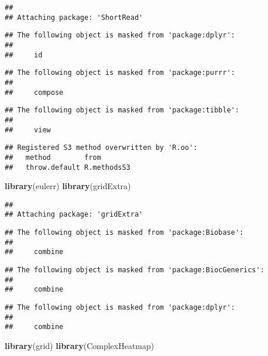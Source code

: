 \documentclass[]{article}
\newenvironment{Shaded}{\begin{snugshade}}{\end{snugshade}}
\newcommand{\KeywordTok}[1]{\textcolor[rgb]{0.13,0.29,0.53}{\textbf{#1}}}
\newcommand{\NormalTok}[1]{#1}
\begin{document}
\begin{verbatim}
## 
## Attaching package: 'ShortRead'
\end{verbatim}

\begin{verbatim}
## The following object is masked from 'package:dplyr':
## 
##     id
\end{verbatim}

\begin{verbatim}
## The following object is masked from 'package:purrr':
## 
##     compose
\end{verbatim}

\begin{verbatim}
## The following object is masked from 'package:tibble':
## 
##     view
\end{verbatim}

\begin{verbatim}
## Registered S3 method overwritten by 'R.oo':
##   method        from       
##   throw.default R.methodsS3
\end{verbatim}

\begin{Shaded}
\begin{Highlighting}[]
\KeywordTok{library}\NormalTok{(eulerr)}
\KeywordTok{library}\NormalTok{(gridExtra)}
\end{Highlighting}
\end{Shaded}

\begin{verbatim}
## 
## Attaching package: 'gridExtra'
\end{verbatim}

\begin{verbatim}
## The following object is masked from 'package:Biobase':
## 
##     combine
\end{verbatim}

\begin{verbatim}
## The following object is masked from 'package:BiocGenerics':
## 
##     combine
\end{verbatim}

\begin{verbatim}
## The following object is masked from 'package:dplyr':
## 
##     combine
\end{verbatim}

\begin{Shaded}
\begin{Highlighting}[]
\KeywordTok{library}\NormalTok{(grid)}
\KeywordTok{library}\NormalTok{(ComplexHeatmap)}
\end{Highlighting}
\end{Shaded}
\end{document}
